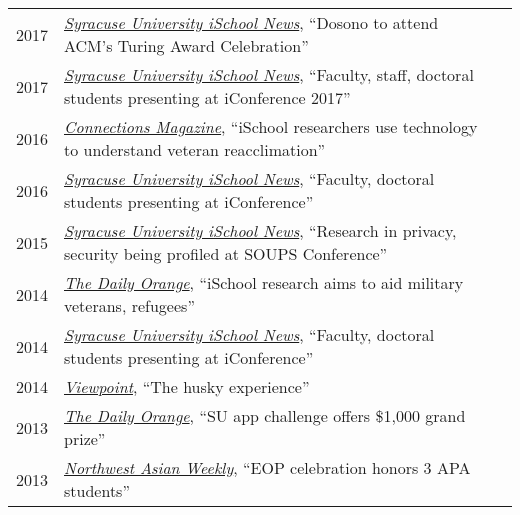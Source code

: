 \documentclass[11pt]{article}
\begin{document}
{{\begin{longtable}{Rp{0.75in}p{5.0in}}
\footnotesize{2017} & \href{https://ischool.syr.edu/dosono-to-attend-acm-turing-award-celebration/}{\textit{Syracuse University iSchool News}}, ``Dosono to attend ACM's Turing Award Celebration''\\

\footnotesize{2017} & \href{https://ischool.syr.edu/faculty-staff-phd-students-presenting-iconference-2017/}{\textit{Syracuse University iSchool News}}, ``Faculty, staff, doctoral students presenting at iConference 2017''\\

\footnotesize{2016} & \href{https://issuu.com/kiefercreative/docs/suischool-connections-sp2016}{\textit{Connections Magazine}}, ``iSchool researchers use technology to understand veteran reacclimation''\\

\footnotesize{2016} & \href{https://ischool.syr.edu/faculty-phd-students-presenting-at-iconference-2016/}{\textit{Syracuse University iSchool News}}, ``Faculty, doctoral students presenting at iConference''\\

\footnotesize{2015} & \href{https://ischool.syr.edu/research-in-privacy-security-profiled-at-soups-conference/}{\textit{Syracuse University iSchool News}}, ``Research in privacy, security being profiled at SOUPS Conference''\\

\footnotesize{2014} & \href{http://dailyorange.com/2014/11/ischool-research-aims-to-aid-military-veterans-refugees/}{\textit{The Daily Orange}}, ``iSchool research aims to aid military veterans, refugees''\\

\footnotesize{2014} & \href{https://ischool.syr.edu/faculty-doctoral-students-presenting-at-iconference/}{\textit{Syracuse University iSchool News}}, ``Faculty, doctoral students presenting at iConference''\\

\footnotesize{2014} & \href{https://issuu.com/uwalumni/docs/viewpoint_2014fall}{\textit{Viewpoint}}, ``The husky experience''\\

\footnotesize{2013} & \href{http://dailyorange.com/2013/10/su-app-challenge-offers-1000-grand-prize/}{\textit{The Daily Orange}}, ``SU app challenge offers \$1,000 grand prize''\\

\footnotesize{2013} & \href{http://www.nwasianweekly.com/2013/07/uw-2013-eop-celebration-honors-3-apa-students/}{\textit{Northwest Asian Weekly}}, ``EOP celebration honors 3 APA students''\\


\end{longtable}}}
\end{document}
